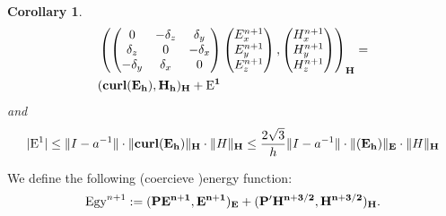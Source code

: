 \documentclass[12pt,reqno]{amsart}
\newcommand{\curl}{{\bf curl}}
\newtheorem{cor}[theorem]{Corollary}
\theoremstyle{definition}
\numberwithin{equation}{section}
\begin{document}
\begin{cor}
	\begin{align*}
		&
		\left(
		\begin{pmatrix}
		0& -\delta_z & \delta _y\\
		\delta_z&0&-\delta_x\\
		-\delta_y&\delta_x&0\\
	\end{pmatrix}
	\begin{pmatrix}
		E_x^{n+1}\\
		E_y^{n+1}\\
		E_z^{n+1}
	\end{pmatrix}, 
\begin{pmatrix}
	H_x^{n+1}\\
	H_y^{n+1}\\
	H_z^{n+1}
	\end{pmatrix}
\right)_{\bf{H}}=\\&
(\mathbf{\curl}(\bf{E}_h),\bf{H}_h)_{\bf{H}}+\mathrm{E}^{1}
	\end{align*}
and $$|\mathrm{E}^{1}|\leq \|I-a^{-1}\|\cdot  \|  {\bf \curl (\bf{E}_h)}\|_{\bf{H}}  \cdot 
\|H\|_{\bf{H}}\leq \frac{2\sqrt{3}}{h}
\|I-a^{-1}\|\cdot  \|  {(\bf{E}_h)}\|_{\bf{E}}  \cdot 
\|H\|_{\bf{H}}
$$
\end{cor}

	We define the following (coercieve )energy function:
$$
\mathrm{Egy}^{n+1}:=({\bf P}\bf{E}^{n+1},\bf{E}^{n+1})_{\bf{E}}+
({\bf P}' {\bf H}^{n+3/2},\bf{H}^{n+3/2})_{\bf{H}}.
$$

	
	
	
\end{document}
